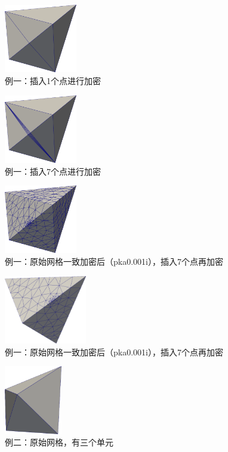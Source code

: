 \begin{figure}[!htbp]
  \centering
  \includegraphics[height=3cm]{fig/2/3.png}
  \caption{例一：插入1个点进行加密}
  \label{fig:2-1}
\end{figure}

\begin{figure}[!htbp]
  \centering
  \includegraphics[height=3cm]{fig/2/4.png}
  \caption{例一：插入7个点进行加密}
  \label{fig:2-1}
\end{figure}

\begin{figure}[!htbp]
  \centering
  \includegraphics[height=3cm]{fig/2/5.png}
  \caption{例一：原始网格一致加密后（pka0.001i），插入7个点再加密}
  \label{fig:2-1}
\end{figure}

\begin{figure}[!htbp]
  \centering
  \includegraphics[height=3cm]{fig/2/6.png}
  \caption{例一：原始网格一致加密后（pka0.001i），插入7个点再加密}
  \label{fig:2-1}
\end{figure}

\begin{figure}[!htbp]
  \centering
  \includegraphics[height=3cm]{fig/2/7.png}
  \caption{例二：原始网格，有三个单元}
  \label{fig:2-1}
\end{figure}

